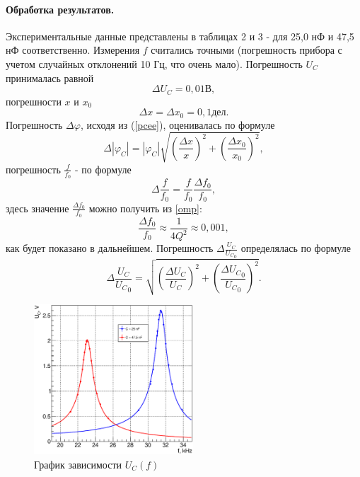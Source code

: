 \documentclass[12pt,a4paper]{article}
\begin{document}
\paragraph{Обработка результатов.} Экспериментальные данные представлены в таблицах 2 и 3 - для 25,0 нФ и 47,5 нФ соответственно. Измерения $f$ считались точными (погрешность прибора с учетом случайных отклонений 10 Гц, что очень мало). Погрешность $U_C$ принималась равной
\begin{equation}
\Delta U_C = 0,01\text{В},
\end{equation}
погрешности $x$ и $x_0$ 
\begin{equation}
\Delta x = \Delta x_0 = 0,1\text{дел}.
\end{equation}
Погрешность $\Delta\varphi$, исходя из (\ref{pcee}), оценивалась по формуле
\begin{equation}
\Delta|\varphi_C| = |\varphi_C|\sqrt{\left(\frac{\Delta x}{x}\right)^2 + \left(\frac{\Delta x_0}{x_0}\right)^2},
\end{equation}
погрешность $\frac{f}{f_0}$ - по формуле
\begin{equation}
\Delta\frac{f}{f_0} = \frac{f}{f_0}\frac{\Delta f_0}{f_0},
\end{equation}
здесь значение $\frac{\Delta f_0}{f_0}$ можно получить из \ref{omp}:
\begin{equation}
\frac{\Delta f_0}{f_0} \approx \frac{1}{4Q^2} \approx 0,001,
\end{equation}
как будет показано в дальнейшем. Погрешность $\Delta\frac{U_C}{{U_C}_0}$ определялась по формуле
\begin{equation}
\Delta\frac{U_C}{{U_C}_0} = \sqrt{\left(\frac{\Delta U_C}{U_C}\right)^2 + \left(\frac{\Delta {U_C}_0}{{U_C}_0}\right)^2}. 
\end{equation}

\begin{figure}
\centering\includegraphics[width = 0.53\textwidth]{Plt2}
\captionsetup{justification = centering}
\caption{График зависимости $U_C(f)$\label{Fig5}}
\vspace{25pt}
\end{figure}
\end{document}
